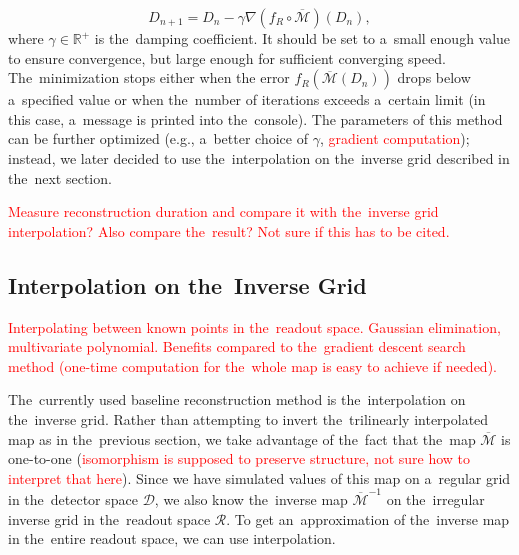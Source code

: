 				\begin{equation}
					D_{n+1} = D_n - \gamma \nabla(f_R\circ\overbar{\mathcal{M}})(D_n),
				\end{equation}
			where $\gamma\in\mathbb{R}^+$ is the~damping coefficient. It should be set to a~small enough value to ensure convergence, but large enough for sufficient converging speed. The~minimization stops either when the error $f_R(\overbar{\mathcal{M}}(D_n))$ drops below a~specified value or when the~number of iterations exceeds a~certain limit (in this case, a~message is printed into the~console).
			The parameters of this method can be further optimized (e.g., a~better choice of $\gamma$, \textcolor{red}{gradient computation}); instead, we later decided to use the~interpolation on the~inverse grid described in the~next section.
			
			\textcolor{red}{Measure reconstruction duration and compare it with the~inverse grid interpolation? Also compare the~result? Not sure if this has to be cited.}
		
		\subsection{Interpolation on the~Inverse Grid}
		\label{sec:interpol}
			\textcolor{red}{Interpolating between known points in the~readout space. Gaussian elimination, multivariate polynomial. Benefits compared to the~gradient descent search method (one-time computation for the~whole map is easy to achieve if needed).}
			
			The~currently used baseline reconstruction method is the~interpolation on the~inverse grid. Rather than attempting to invert the~trilinearly interpolated map as in the~previous section, we take advantage of the~fact that the~map $\overbar{\mathcal{M}}$ is one-to-one (\textcolor{red}{isomorphism is supposed to preserve structure, not sure how to interpret that here}). Since we have simulated values of this map on a~regular grid in the~detector space $\mathcal{D}$, we also know the~inverse map $\overbar{\mathcal{M}}^{-1}$ on the~irregular inverse grid in the~readout space $\mathcal{R}$. To get an~approximation of the~inverse map in the~entire readout space, we can use interpolation.
			
